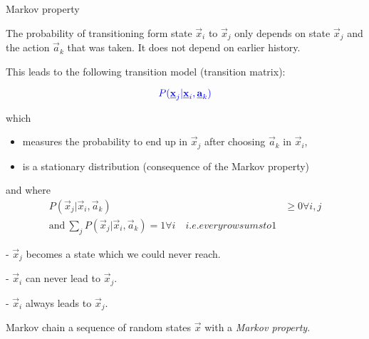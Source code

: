\begin{frame}
\begin{block}{Markov property}

The probability of transitioning form state $\vec x_i$ to $\vec x_j$ only depends on state $\vec x_j$ and the action $\vec a_k$ that was taken. It does not depend on earlier history.
\end{block}

This leads to the following \textcolor{trans}{transition model (transition matrix)}:

\begin{equation}
{
\color{trans}
P(\vec x_j | \vec x_i, \vec a_k)
}
\end{equation}

which
\begin{itemize}
	\item measures the probability to end up in $\vec x_j$ 
		after choosing $\vec a_k$ in $\vec x_i$,
	\item is a stationary distribution (consequence of the Markov property)
\end{itemize}

and where
\begin{align}
P(\vec x_j | \vec x_i, \vec a_k) &\ge 0 \forall i,j\\
\text{and}~ \sum_j P(\vec x_j | \vec x_i, \vec a_k) = 1 \forall i \quad i.e. every row sums to 1
\end{align}


- $\vec x_j$ becomes a state which we could never reach.



- $\vec x_i$ can never lead to $\vec x_j$.


- $\vec x_i$ always leads to $\vec x_j$.

\begin{block}{Markov chain}
a sequence of random states $\vec x$ with a \emph{Markov property}.
\end{block}


\end{frame}

